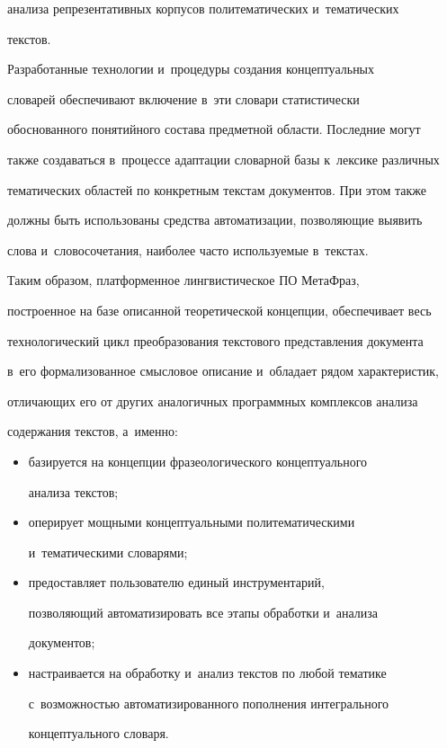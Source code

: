 анализа репрезентативных корпусов политематических и~тематических 


текстов.


     


     Разработанные технологии и~процедуры создания концептуальных 


словарей обеспечивают включение в~эти словари статистически 


обоснованного понятийного состава предметной области. Последние могут 


также создаваться в~процессе адап\-та\-ции словарной базы к~лексике различных 


тематических областей по конкретным текстам документов. При этом также 


должны быть использованы средства автоматизации, позволяющие выявить 


слова и~словосочетания, наиболее часто используемые в~текстах.


     


     Таким образом, платформенное лингвистическое ПО МетаФраз, 


построенное на базе описанной теоретической концепции, обеспечивает весь 


технологический цикл преобразования текстового представления документа 


в~его формализованное смысловое описание и~обладает рядом характеристик, 


отличающих его от других аналогичных программных комплексов анализа 


содержания текстов, а~именно:


     \begin{itemize}


\item базируется на концепции фразеологического концептуального 


анализа текс\-тов;


\item оперирует мощными концептуальными политематическими 


и~тематическими словарями;


\item предоставляет пользователю единый инструментарий, 


позволяющий автоматизировать все этапы обработки и~анализа 


документов;


\item настраивается на обработку и~анализ текстов по любой тематике 


с~воз\-мож\-ностью автоматизированного пополнения интегрального 


концептуального словаря.


\end{itemize}





